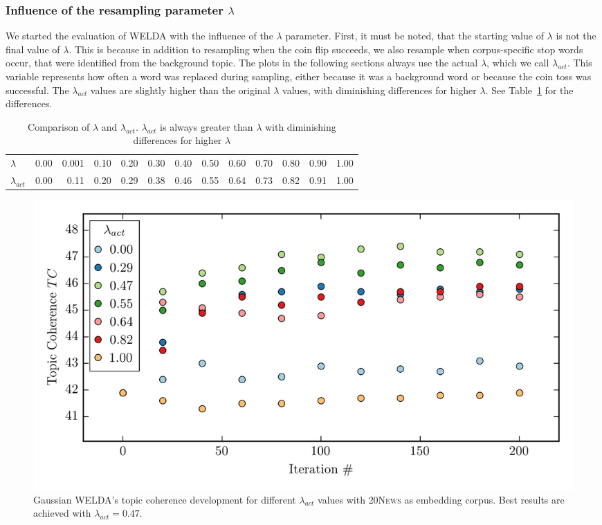 \documentclass[
        a4paper,
        titlepage,
        twoside,
        parskip,
        numbers=noenddot
        ]{scrbook}
\newcommand{\ra}[1]{\renewcommand{\arraystretch}{#1}}
\theoremstyle{break}
\begin{document}
\subsubsection{Influence of the resampling parameter $\lambda$}
We started the evaluation of WELDA with the influence of the $\lambda$ parameter.
First, it must be noted, that the starting value of $\lambda$ is not the final value of $\lambda$.
This is because in addition to resampling when the coin flip succeeds, we also resample when corpus-specific stop words occur, that were identified from the background topic.
The plots in the following sections always use the actual $\lambda$, which we call $\lambda_{act}$.
This variable represents how often a word was replaced during sampling, either because it was a background word or because the coin toss was successful.
The $\lambda_{act}$ values are slightly higher than the original $\lambda$ values, with diminishing differences for higher $\lambda$.
See Table~\ref{table:actual_lambda} for the differences.
\begin{table}[]
  \ra{1.2}
  \centering
  \caption{Comparison of $\lambda$ and $\lambda_{act}$. $\lambda_{act}$ is always greater than $\lambda$ with diminishing differences for higher $\lambda$}
  \label{table:actual_lambda}
  \begin{tabular}{lrrrrrrrrrrrr}
    \toprule
    $\lambda$     & 0.00 & 0.001 & 0.10  & 0.20  & 0.30  & 0.40  & 0.50  & 0.60  & 0.70  & 0.80  & 0.90  & 1.00 \\
    $\lambda_{act}$ & 0.00 & 0.11  & 0.20 & 0.29 & 0.38 & 0.46 & 0.55 & 0.64 & 0.73 & 0.82 & 0.91 & 1.00 \\
    \bottomrule
  \end{tabular}
\end{table}

\begin{figure}
       \centering
       \includegraphics[width=\textwidth]{figures/welda_gaussian_lambda_20news.png}
       \caption{Gaussian WELDA's topic coherence development for different $\lambda_{act}$ values with \textsc{20News} as embedding corpus.
       Best results are achieved with $\lambda_{act} = 0.47$.}
       \label{fig:welda_gaussian_lambda_20news}
\end{figure}
\end{document}
